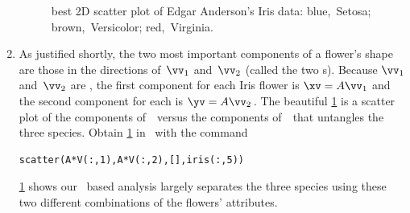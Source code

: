 \begin{example}
\begin{solution}
\begin{enumerate}
\begin{figure}
\centering
{}
\caption{best 2D scatter plot of Edgar Anderson's Iris data: blue,~Setosa; brown,~Versicolor; red,~Virginia. }
\label{fig:eaidpca}
\end{figure}%
\item As justified shortly, the two most important components of a flower's shape are those in the directions of~\(\vv_1\) and~\(\vv_2\) (called the two s).
Because \(\vv_1\) and~\(\vv_2\) are , the first component for each Iris flower is \(\xv=A\vv_1\) and the second component for each is \(\yv=A\vv_2\)\,.
The beautiful \cref{fig:eaidpca} is a scatter plot of the components of~\yv\ versus the components of~\xv\ that untangles the three species.
Obtain \cref{fig:eaidpca} in \script\ with the command
\begin{verbatim}
scatter(A*V(:,1),A*V(:,2),[],iris(:,5))
\end{verbatim}
\cref{fig:eaidpca} shows our \svd\ based analysis largely separates the three species using these two different combinations of the flowers' attributes.
\end{enumerate}
\end{solution}
\end{example}





